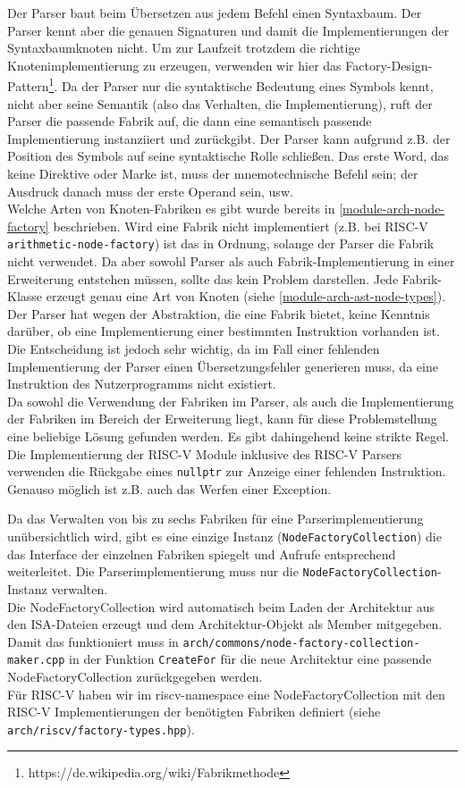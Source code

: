 Der Parser baut beim Übersetzen aus jedem Befehl einen Syntaxbaum. Der Parser
kennt aber die genauen Signaturen und damit die Implementierungen der
Syntaxbaumknoten nicht. Um zur Laufzeit trotzdem die richtige
Knotenimplementierung zu erzeugen, verwenden wir hier das
Factory-Design-Pattern\footnote{https://de.wikipedia.org/wiki/Fabrikmethode}. Da
der Parser nur die syntaktische Bedeutung eines Symbols kennt, nicht aber seine
Semantik (also das Verhalten, die Implementierung), ruft der Parser die passende
Fabrik auf, die dann eine semantisch passende Implementierung instanziiert und
zurückgibt. Der Parser kann aufgrund z.B. der Position des Symbols auf seine
syntaktische Rolle schließen. Das erste Word, das keine Direktive oder Marke
ist, muss der mnemotechnische Befehl sein; der Ausdruck danach muss der erste
Operand sein, usw. \\
Welche Arten von Knoten-Fabriken es gibt wurde bereits in
\autoref{module-arch-node-factory} beschrieben. Wird eine Fabrik nicht
implementiert (z.B. bei RISC-V \texttt{arithmetic-node-factory}) ist das in
Ordnung, solange der Parser die Fabrik nicht verwendet. Da aber sowohl Parser
als auch Fabrik-Implementierung in einer Erweiterung entstehen müssen, sollte
das kein Problem darstellen. Jede Fabrik-Klasse erzeugt genau eine Art von
Knoten (siehe \autoref{module-arch-ast-node-types}).\\

Der Parser hat wegen der Abstraktion, die eine Fabrik bietet, keine Kenntnis
darüber, ob eine Implementierung einer bestimmten Instruktion vorhanden ist. Die
Entscheidung ist jedoch sehr wichtig, da im Fall einer fehlenden Implementierung
der Parser einen Übersetzungsfehler generieren muss, da eine Instruktion des
Nutzerprogramms nicht existiert.\\
Da sowohl die Verwendung der Fabriken im Parser, als auch die Implementierung
der Fabriken im Bereich der Erweiterung liegt, kann für diese Problemstellung
eine beliebige Lösung gefunden werden. Es gibt dahingehend keine strikte
Regel.\\
Die Implementierung der RISC-V Module inklusive des RISC-V Parsers verwenden die
Rückgabe eines \texttt{nullptr} zur Anzeige einer fehlenden Instruktion. Genauso
möglich ist z.B. auch das Werfen einer Exception.

Da das Verwalten von bis zu sechs Fabriken für eine Parserimplementierung
unübersichtlich wird, gibt es eine einzige Instanz
(\texttt{NodeFactoryCollection}) die das Interface der einzelnen Fabriken
spiegelt und Aufrufe entsprechend weiterleitet. Die Parserimplementierung muss
nur die \texttt{NodeFactoryCollection}-Instanz verwalten.\\
Die NodeFactoryCollection wird automatisch beim Laden der Architektur aus den
ISA-Dateien erzeugt und dem Architektur-Objekt als Member mitgegeben. Damit das
funktioniert muss in \texttt{arch/commons/node-factory-collection-maker.cpp} in
der Funktion \texttt{CreateFor} für die neue Architektur eine passende
NodeFactoryCollection zurückgegeben werden.\\
Für RISC-V haben wir im riscv-namespace eine NodeFactoryCollection mit den
RISC-V Implementierungen der benötigten Fabriken definiert (siehe
\texttt{arch/riscv/factory-types.hpp}).

